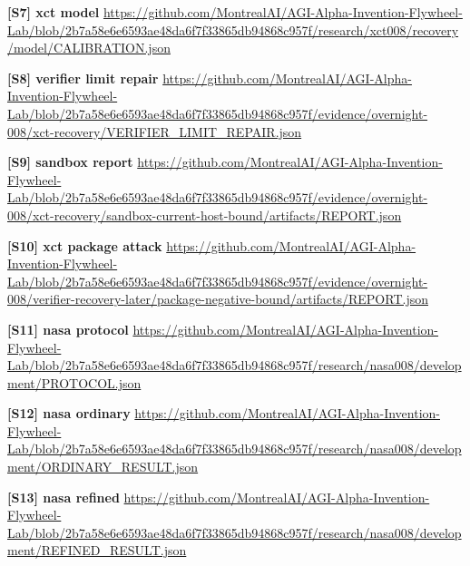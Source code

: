 \documentclass[11pt,letterpaper]{article}
\begin{document}
\begin{samepage}\small\textbf{[S7] xct model} \url{https://github.com/MontrealAI/AGI-Alpha-Invention-Flywheel-Lab/blob/2b7a58e6e6593ae48da6f7f33865db94868c957f/research/xct008/recovery/model/CALIBRATION.json}\par\normalsize\end{samepage}
\begin{samepage}\small\textbf{[S8] verifier limit repair} \url{https://github.com/MontrealAI/AGI-Alpha-Invention-Flywheel-Lab/blob/2b7a58e6e6593ae48da6f7f33865db94868c957f/evidence/overnight-008/xct-recovery/VERIFIER_LIMIT_REPAIR.json}\par\normalsize\end{samepage}
\begin{samepage}\small\textbf{[S9] sandbox report} \url{https://github.com/MontrealAI/AGI-Alpha-Invention-Flywheel-Lab/blob/2b7a58e6e6593ae48da6f7f33865db94868c957f/evidence/overnight-008/xct-recovery/sandbox-current-host-bound/artifacts/REPORT.json}\par\normalsize\end{samepage}
\begin{samepage}\small\textbf{[S10] xct package attack} \url{https://github.com/MontrealAI/AGI-Alpha-Invention-Flywheel-Lab/blob/2b7a58e6e6593ae48da6f7f33865db94868c957f/evidence/overnight-008/verifier-recovery-later/package-negative-bound/artifacts/REPORT.json}\par\normalsize\end{samepage}
\begin{samepage}\small\textbf{[S11] nasa protocol} \url{https://github.com/MontrealAI/AGI-Alpha-Invention-Flywheel-Lab/blob/2b7a58e6e6593ae48da6f7f33865db94868c957f/research/nasa008/development/PROTOCOL.json}\par\normalsize\end{samepage}
\begin{samepage}\small\textbf{[S12] nasa ordinary} \url{https://github.com/MontrealAI/AGI-Alpha-Invention-Flywheel-Lab/blob/2b7a58e6e6593ae48da6f7f33865db94868c957f/research/nasa008/development/ORDINARY_RESULT.json}\par\normalsize\end{samepage}
\begin{samepage}\small\textbf{[S13] nasa refined} \url{https://github.com/MontrealAI/AGI-Alpha-Invention-Flywheel-Lab/blob/2b7a58e6e6593ae48da6f7f33865db94868c957f/research/nasa008/development/REFINED_RESULT.json}\par\normalsize\end{samepage}
\end{document}
